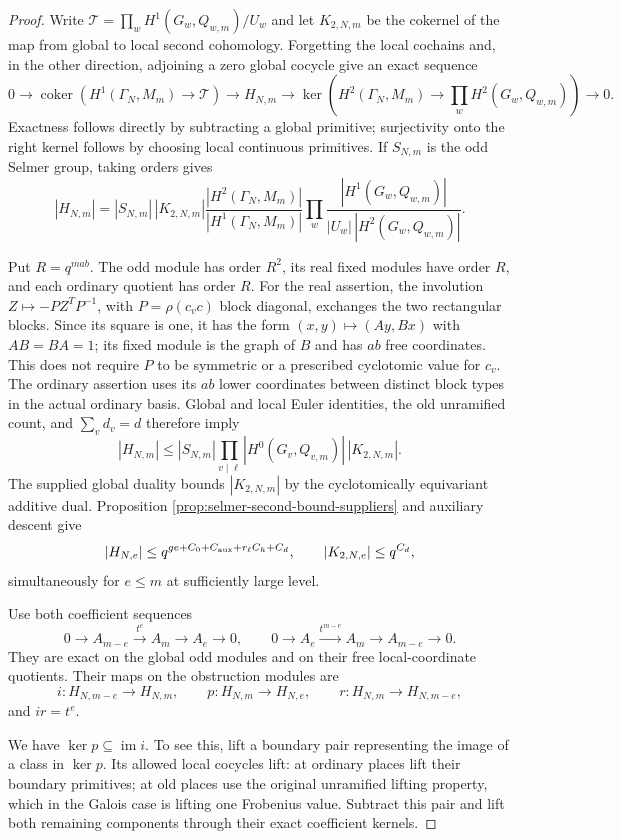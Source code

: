 \begin{proof}
Write $\mathcal T=\prod_wH^1(G_w,Q_{w,m})/U_w$ and let
$K_{2,N,m}$ be the cokernel of the map from global to local
second cohomology. Forgetting the local cochains and, in the
other direction, adjoining a zero global cocycle give an exact
sequence
\[
 0\to\operatorname{coker}(H^1(\Gamma_N,M_m)\to\mathcal T)
 \to H_{N,m}\to\ker(H^2(\Gamma_N,M_m)\to
                  \prod_wH^2(G_w,Q_{w,m}))\to0.
\]
Exactness follows directly by subtracting a global primitive;
surjectivity onto the right kernel follows by choosing local
continuous primitives. If $S_{N,m}$ is the odd Selmer group,
taking orders gives
\[
 |H_{N,m}|=|S_{N,m}|\,|K_{2,N,m}|
 \frac{|H^2(\Gamma_N,M_m)|}{|H^1(\Gamma_N,M_m)|}
 \prod_w\frac{|H^1(G_w,Q_{w,m})|}
                 {|U_w|\,|H^2(G_w,Q_{w,m})|}.
\]

Put $R=q^{mab}$. The odd module has order $R^2$, its real
fixed modules have order $R$, and each ordinary quotient has
order $R$. For the real assertion, the involution
$Z\mapsto-PZ^TP^{-1}$, with $P=\rho(c_vc)$ block diagonal,
exchanges the two rectangular blocks. Since its square is one,
it has the form $(x,y)\mapsto(Ay,Bx)$ with $AB=BA=1$; its
fixed module is the graph of $B$ and has $ab$ free coordinates.
This does not require $P$ to be symmetric or a prescribed
cyclotomic value for $c_v$. The ordinary assertion uses its $ab$ lower coordinates
between distinct block types in the actual ordinary basis.
Global and local Euler identities, the old unramified count,
and $\sum_vd_v=d$ therefore imply
\[
 |H_{N,m}|\leq |S_{N,m}|
       \prod_{v\mid\ell}|H^0(G_v,Q_{v,m})|\,|K_{2,N,m}|.
\]
The supplied global duality bounds $|K_{2,N,m}|$ by the
cyclotomically equivariant additive dual. Proposition
\ref{prop:selmer-second-bound-suppliers} and auxiliary descent give
\[
 |H_{N,e}|\leq q^{ge+C_0+C_{\rm aux}+r_\ell C_h+C_d},
 \qquad |K_{2,N,e}|\leq q^{C_d},
\]
simultaneously for $e\leq m$ at sufficiently large level.

Use both coefficient sequences
\[
 0\to A_{m-e}\xrightarrow{t^e}A_m\to A_e\to0,\qquad
 0\to A_e\xrightarrow{t^{m-e}}A_m\to A_{m-e}\to0.
\]
They are exact on the global odd modules and on their free
local-coordinate quotients. Their maps on the obstruction modules are
\[
 i:H_{N,m-e}\to H_{N,m},\qquad
 p:H_{N,m}\to H_{N,e},\qquad
 r:H_{N,m}\to H_{N,m-e},
\]
and $ir=t^e$.

We have $\ker p\subseteq\operatorname{im}i$. To see this, lift
a boundary pair representing the image of a class in $\ker p$.
Its allowed local cocycles lift: at ordinary places lift their
boundary primitives; at old places use the original unramified
lifting property, which in the Galois case is lifting one
Frobenius value. Subtract this pair and lift both remaining
components through their exact coefficient kernels.


\end{proof}
